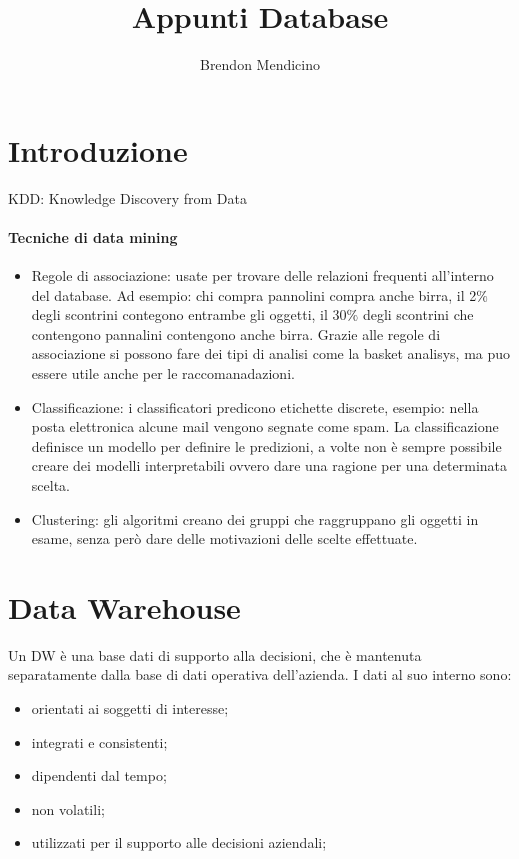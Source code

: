 \documentclass[12pt]{article}
\title{Appunti Database}
\author{Brendon Mendicino}
\begin{document}
\maketitle
\newpage
\tableofcontents
\newpage


\section{Introduzione}\label{sec:introduzione}


KDD: Knowledge Discovery from Data

\paragraph{Tecniche di data mining}
\begin{itemize}
    \item Regole di associazione: usate per trovare delle relazioni frequenti all'interno del database. Ad esempio: chi compra pannolini compra anche birra, il 2$\%$ degli scontrini contegono entrambe gli oggetti, il 30$\%$ degli scontrini che contengono pannalini contengono anche birra. Grazie alle regole di associazione si possono fare dei tipi di analisi come la basket analisys, ma puo essere utile anche per le raccomanadazioni.
    \item Classificazione: i classificatori predicono etichette discrete, esempio: nella posta elettronica alcune mail vengono segnate come spam. La classificazione definisce un modello per definire le predizioni, a volte non \`e sempre possibile creare dei modelli interpretabili ovvero dare una ragione per una determinata scelta.
    \item Clustering: gli algoritmi creano dei gruppi che raggruppano gli oggetti in esame, senza per\`o dare delle motivazioni delle scelte effettuate.
\end{itemize}





\section{Data Warehouse}
Un DW  \`e una base dati di supporto alla decisioni, che \`e mantenuta separatamente dalla base di dati operativa dell'azienda. I dati al suo interno sono:
\begin{itemize}
    \item orientati ai soggetti di interesse;
    \item integrati e consistenti;
    \item dipendenti dal tempo;
    \item non volatili;
    \item utilizzati per il supporto alle decisioni aziendali;
\end{itemize}
\end{document}
